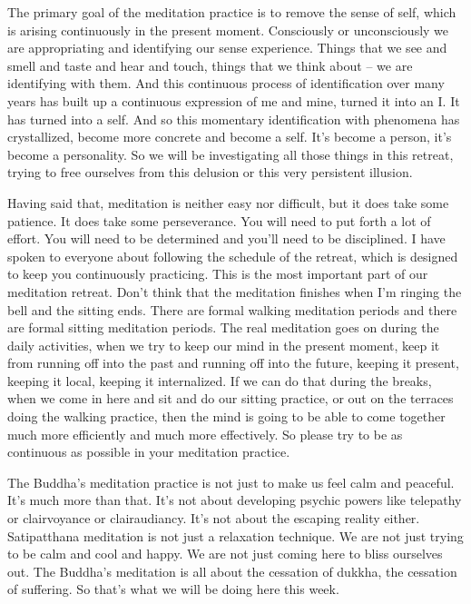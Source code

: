 \documentclass[letterpaper,10pt,english]{sphinxmanual}
\begin{document}
\sphinxAtStartPar
The primary goal of the meditation practice is to remove the sense of
self,  which  is  arising  continuously  in  the  present  moment.  Consciously  or
unconsciously  we  are  appropriating  and  identifying  our  sense  experience.
Things that we see and smell and taste and hear and touch, things that we
think about – we are identifying with them. And this continuous process of
identification over many years has built up a continuous expression of me
and mine, turned it into an I. It has turned into a self. And so this momentary
identification with phenomena has crystallized, become more concrete and
become a self. It’s become a person, it’s become a personality. So we will be
investigating all those things in this retreat, trying to free ourselves from this
delusion or this very persistent illusion.

\sphinxAtStartPar
{}   Having  said  that,  meditation  is  neither  easy  nor  difficult,  but  it  does
take  some  patience.  It  does  take  some  perseverance. You  will  need  to  put
forth a lot of effort. You will need to be determined and you’ll need to be
disciplined. I have spoken to everyone about following the schedule of the
retreat, which is designed to keep you continuously practicing. This is the
most important part of our meditation retreat. Don’t think that the meditation finishes when I’m ringing the bell and the sitting ends. There are formal
walking meditation periods and there are formal sitting meditation periods.
The real meditation goes on during the daily activities, when we try to keep
our mind in the present moment, keep it from running off into the past and
running  off  into  the future, keeping it present, keeping it local, keeping it
internalized.  If  we  can  do  that  during  the  breaks,  when  we  come  in  here
and  sit  and  do  our  sitting  practice,  or  out  on  the  terraces  doing  the  walking practice, then the mind is going to be able to come together much more
efficiently and much more effectively. So please try to be as continuous as
possible in your meditation practice.

\sphinxAtStartPar
The Buddha’s meditation practice is not just to make us feel calm and
peaceful. It’s much more than that. It’s not about developing psychic powers
like telepathy or clairvoyance or clair\sphinxhyphen{}audiancy. It’s not about the escaping
reality either. Satipatthana meditation is not just a relaxation technique. We
are not just trying to be calm and cool and happy. We are not just coming
here to bliss ourselves out. The Buddha’s meditation is all about the cessation of dukkha, the cessation of suffering. So that’s what we will be doing
here this week.
\end{document}
